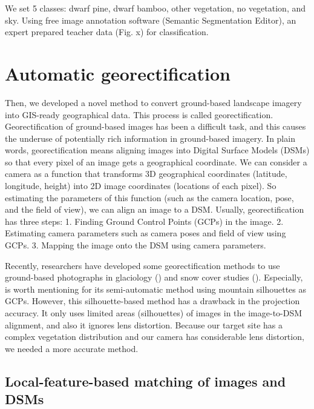 \documentclass{article}
\begin{document}
We set 5 classes: dwarf pine, dwarf bamboo, other vegetation, no
vegetation, and sky. Using free image annotation software (Semantic
Segmentation Editor), an expert prepared teacher data (Fig. x) for
classification.

\hypertarget{automatic-georectification}{%
\section{Automatic georectification}\label{automatic-georectification}}

Then, we developed a novel method to convert ground-based landscape
imagery into GIS-ready geographical data. This process is called
georectification. Georectification of ground-based images has been a
difficult task, and this causes the underuse of potentially rich
information in ground-based imagery. In plain words, georectification
means aligning images into Digital Surface Models (DSMs) so that every
pixel of an image gets a geographical coordinate. We can consider a
camera as a function that transforms 3D geographical coordinates
(latitude, longitude, height) into 2D image coordinates (locations of
each pixel). So estimating the parameters of this function (such as the
camera location, pose, and the field of view), we can align an image to
a DSM. Usually, georectification has three steps: 1. Finding Ground
Control Points (GCPs) in the image. 2. Estimating camera parameters such
as camera poses and field of view using GCPs. 3. Mapping the image onto
the DSM using camera parameters.

Recently, researchers have developed some georectification methods to
use ground-based photographs in glaciology (\cite{Messerli2015GeoInst})
and snow cover studies (\cite{Portenier2020Cryosphere}). Especially,
\cite{Portenier2020Cryosphere} is worth mentioning for its
semi-automatic method using mountain silhouettes as GCPs. However, this
silhouette-based method has a drawback in the projection accuracy. It
only uses limited areas (silhouettes) of images in the image-to-DSM
alignment, and also it ignores lens distortion. Because our target site
has a complex vegetation distribution and our camera has considerable
lens distortion, we needed a more accurate method.

\hypertarget{local-feature-based-matching-of-images-and-dsms}{%
\subsection{Local-feature-based matching of images and
DSMs}\label{local-feature-based-matching-of-images-and-dsms}}
\end{document}
